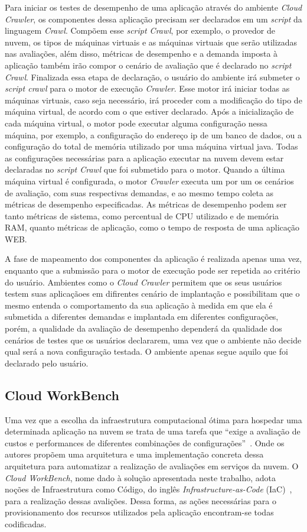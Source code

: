 Para iniciar os testes de desempenho de uma aplicação através do ambiente {\em Cloud Crawler}, os componentes dessa aplicação precisam ser declarados em um \textit{script} da linguagem {\em Crawl}. Compõem esse \textit{script Crawl}, por exemplo, o provedor de nuvem, os tipos de máquinas virtuais e as máquinas virtuais que serão utilizadas nas avaliações, além disso, métricas de desempenho e a demanda imposta à aplicação também irão compor o cenário de avaliação que é declarado no \textit{script Crawl}. Finalizada essa etapa de declaração, o usuário do ambiente irá submeter o \textit{script crawl} para o motor de execução {\em Crawler}. Esse motor irá iniciar todas as máquinas virtuais, caso seja necessário, irá proceder com a modificação do tipo de máquina virtual, de acordo com o que estiver declarado. Após a inicialização de cada máquina virtual, o motor pode executar alguma configuração nessa máquina, por exemplo, a configuração do endereço ip de um banco de dados, ou a configuração do total de memória utilizado por uma máquina virtual java. Todas as configurações necessárias para a aplicação executar na nuvem devem estar declaradas no {\em script Crawl} que foi submetido para o motor. Quando a última máquina virtual é configurada, o motor {\em Crawler} executa um por um os cenários de avaliação, com suas respectivas demandas, e ao mesmo tempo coleta as métricas de desempenho especificadas. As métricas de desempenho podem ser tanto métricas de sistema, como percentual de CPU utilizado e de memória RAM, quanto métricas de aplicação, como o tempo de resposta de uma aplicação WEB.

A fase de mapeamento dos componentes da aplicação é realizada apenas uma vez, enquanto que a submissão para o motor de execução pode ser repetida ao critério do usuário. Ambientes como o {\em Cloud Crawler} permitem que os seus usuários testem suas aplicaçãoes em difirentes cenário de implantação e possibilitam que o mesmo entenda o comportamento da sua aplicação à medida em que ela é submetida a diferentes demandas e implantada em diferentes configurações, porém, a qualidade da avaliação de desempenho dependerá da qualidade dos cenários de testes que os usuários declararem, uma vez que o ambiente não decide qual será a nova configuração testada. O ambiente apenas segue aquilo que foi declarado pelo usuário.

\subsection{Cloud WorkBench}
Uma vez que a escolha da infraestrutura computacional ótima para hospedar uma determinada aplicação na nuvem se trata de uma tarefa que ``exige a avaliação de custos e performances de diferentes combinações de configurações''~\cite{scheuner2014cloud}. Onde os autores propõem uma arquitetura e uma implementação concreta dessa arquitetura para automatizar a realização de avaliações em serviços da nuvem. O {\em Cloud WorkBench}, nome dado à solução apresentada neste trabalho, adota noções de Infraestrutura como Código, do inglês {\em Infrastructure-as-Code} (IaC)~\cite{huttermann2012devops}, para a realização dessas avalições. Dessa forma, as ações necessárias para o provisionamento dos recursos utilizados pela aplicação encontram-se todas codificadas.

